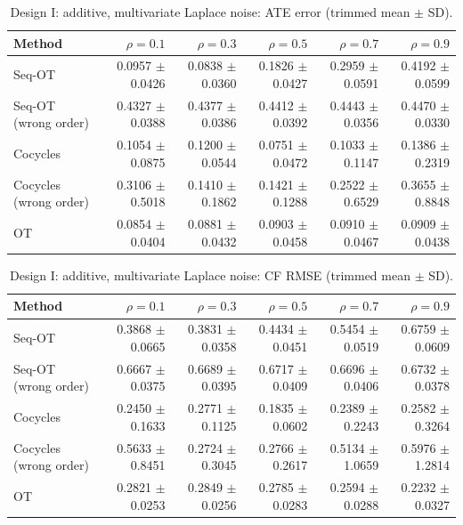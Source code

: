 
\begin{table}[t]
\centering
\caption{Design I: additive, multivariate Laplace noise: ATE error (trimmed mean $\pm$ SD).}
\begin{tabular}{lrrrrr}
\toprule
Method & $\rho=0.1$ & $\rho=0.3$ & $\rho=0.5$ & $\rho=0.7$ & $\rho=0.9$ \\
\midrule
Seq-OT & 0.0957 $\pm$ 0.0426 & 0.0838 $\pm$ 0.0360 & 0.1826 $\pm$ 0.0427 & 0.2959 $\pm$ 0.0591 & 0.4192 $\pm$ 0.0599 \\
Seq-OT (wrong order) & 0.4327 $\pm$ 0.0388 & 0.4377 $\pm$ 0.0386 & 0.4412 $\pm$ 0.0392 & 0.4443 $\pm$ 0.0356 & 0.4470 $\pm$ 0.0330 \\
Cocycles & 0.1054 $\pm$ 0.0875 & 0.1200 $\pm$ 0.0544 & 0.0751 $\pm$ 0.0472 & 0.1033 $\pm$ 0.1147 & 0.1386 $\pm$ 0.2319 \\
Cocycles (wrong order) & 0.3106 $\pm$ 0.5018 & 0.1410 $\pm$ 0.1862 & 0.1421 $\pm$ 0.1288 & 0.2522 $\pm$ 0.6529 & 0.3655 $\pm$ 0.8848 \\
OT & 0.0854 $\pm$ 0.0404 & 0.0881 $\pm$ 0.0432 & 0.0903 $\pm$ 0.0458 & 0.0910 $\pm$ 0.0467 & 0.0909 $\pm$ 0.0438 \\
\bottomrule
\end{tabular}
\end{table}

\begin{table}[t]
\centering
\caption{Design I: additive, multivariate Laplace noise: CF RMSE (trimmed mean $\pm$ SD).}
\begin{tabular}{lrrrrr}
\toprule
Method & $\rho=0.1$ & $\rho=0.3$ & $\rho=0.5$ & $\rho=0.7$ & $\rho=0.9$ \\
\midrule
Seq-OT & 0.3868 $\pm$ 0.0665 & 0.3831 $\pm$ 0.0358 & 0.4434 $\pm$ 0.0451 & 0.5454 $\pm$ 0.0519 & 0.6759 $\pm$ 0.0609 \\
Seq-OT (wrong order) & 0.6667 $\pm$ 0.0375 & 0.6689 $\pm$ 0.0395 & 0.6717 $\pm$ 0.0409 & 0.6696 $\pm$ 0.0406 & 0.6732 $\pm$ 0.0378 \\
Cocycles & 0.2450 $\pm$ 0.1633 & 0.2771 $\pm$ 0.1125 & 0.1835 $\pm$ 0.0602 & 0.2389 $\pm$ 0.2243 & 0.2582 $\pm$ 0.3264 \\
Cocycles (wrong order) & 0.5633 $\pm$ 0.8451 & 0.2724 $\pm$ 0.3045 & 0.2766 $\pm$ 0.2617 & 0.5134 $\pm$ 1.0659 & 0.5976 $\pm$ 1.2814 \\
OT & 0.2821 $\pm$ 0.0253 & 0.2849 $\pm$ 0.0256 & 0.2785 $\pm$ 0.0283 & 0.2594 $\pm$ 0.0288 & 0.2232 $\pm$ 0.0327 \\
\bottomrule
\end{tabular}
\end{table}

